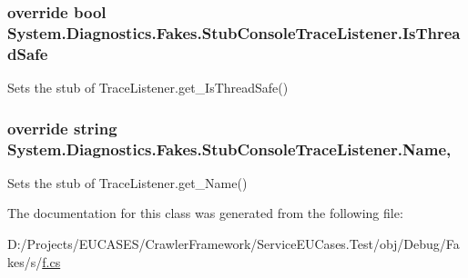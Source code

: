 \hypertarget{class_system_1_1_diagnostics_1_1_fakes_1_1_stub_console_trace_listener_a1d348301841795e30d71c3128605afb9}{
\subsubsection[{Is\-Thread\-Safe}]{\setlength{\rightskip}{0pt plus 5cm}override bool System.\-Diagnostics.\-Fakes.\-Stub\-Console\-Trace\-Listener.\-Is\-Thread\-Safe\hspace{0.3cm}{\ttfamily [get]}}}\label{class_system_1_1_diagnostics_1_1_fakes_1_1_stub_console_trace_listener_a1d348301841795e30d71c3128605afb9}


Sets the stub of Trace\-Listener.\-get\-\_\-\-Is\-Thread\-Safe()

\hypertarget{class_system_1_1_diagnostics_1_1_fakes_1_1_stub_console_trace_listener_a47f3547cd380d01765a3ac32eb402f63}{
\subsubsection[{Name}]{\setlength{\rightskip}{0pt plus 5cm}override string System.\-Diagnostics.\-Fakes.\-Stub\-Console\-Trace\-Listener.\-Name\hspace{0.3cm}{\ttfamily [get]}, {\ttfamily [set]}}}\label{class_system_1_1_diagnostics_1_1_fakes_1_1_stub_console_trace_listener_a47f3547cd380d01765a3ac32eb402f63}


Sets the stub of Trace\-Listener.\-get\-\_\-\-Name()



The documentation for this class was generated from the following file\-:\begin{DoxyCompactItemize}
\item 
D\-:/\-Projects/\-E\-U\-C\-A\-S\-E\-S/\-Crawler\-Framework/\-Service\-E\-U\-Cases.\-Test/obj/\-Debug/\-Fakes/s/\hyperlink{s_2f_8cs}{f.\-cs}\end{DoxyCompactItemize}
